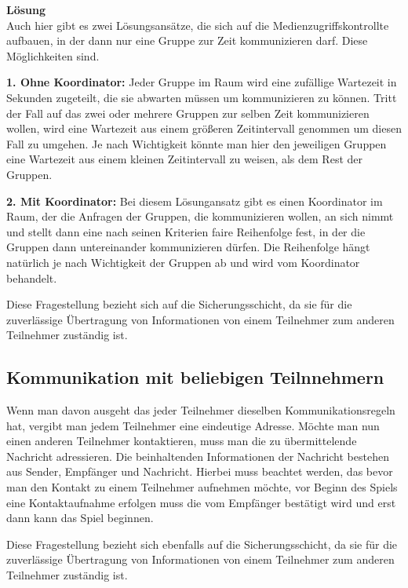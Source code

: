 \documentclass{scrartcl}
\begin{document}
   \textbf{Lösung}\\
   Auch hier gibt es zwei Lösungsansätze, die sich auf die Medienzugriffskontrollte aufbauen, in der dann nur eine Gruppe zur Zeit kommunizieren darf. Diese Möglichkeiten sind.
   
   \textbf{1. Ohne Koordinator:} Jeder Gruppe im Raum wird eine zufällige Wartezeit in Sekunden zugeteilt, die sie abwarten müssen um kommunizieren zu können. Tritt der Fall auf das zwei oder mehrere Gruppen zur selben Zeit kommunizieren wollen, wird eine Wartezeit aus einem größeren Zeitintervall genommen um diesen Fall zu umgehen. Je nach Wichtigkeit könnte man hier den jeweiligen Gruppen eine Wartezeit aus einem kleinen Zeitintervall zu weisen, als dem Rest der Gruppen.
   
   \textbf{2. Mit Koordinator:} Bei diesem Lösungansatz gibt es einen Koordinator im Raum, der die Anfragen der Gruppen, die kommunizieren wollen, an sich nimmt und stellt dann eine nach seinen Kriterien faire Reihenfolge fest, in der die Gruppen dann untereinander kommunizieren dürfen. Die Reihenfolge hängt natürlich je nach Wichtigkeit der Gruppen ab und wird vom Koordinator behandelt.
   
   Diese Fragestellung bezieht sich auf die Sicherungsschicht, da sie für die zuverlässige Übertragung von Informationen von einem Teilnehmer zum anderen Teilnehmer zuständig ist.
   
   \newpage
    \subsection[Aufgabe 7 Kommunikation mit beliebigen Teilnnehmern]{Kommunikation mit beliebigen Teilnnehmern}
    
    Wenn man davon ausgeht das jeder Teilnehmer dieselben Kommunikationsregeln hat, vergibt man jedem Teilnehmer eine eindeutige Adresse. Möchte man nun einen anderen Teilnehmer kontaktieren, muss man die zu übermittelende Nachricht adressieren. Die beinhaltenden Informationen der Nachricht bestehen aus Sender, Empfänger und Nachricht. Hierbei muss beachtet werden, das bevor man den Kontakt zu einem Teilnehmer aufnehmen möchte, vor Beginn des Spiels eine Kontaktaufnahme erfolgen muss die vom Empfänger bestätigt wird und erst dann kann das Spiel beginnen.
    
    Diese Fragestellung bezieht sich ebenfalls auf die Sicherungsschicht, da sie für die zuverlässige Übertragung von Informationen von einem Teilnehmer zum anderen Teilnehmer zuständig ist.
    
\end{document}
